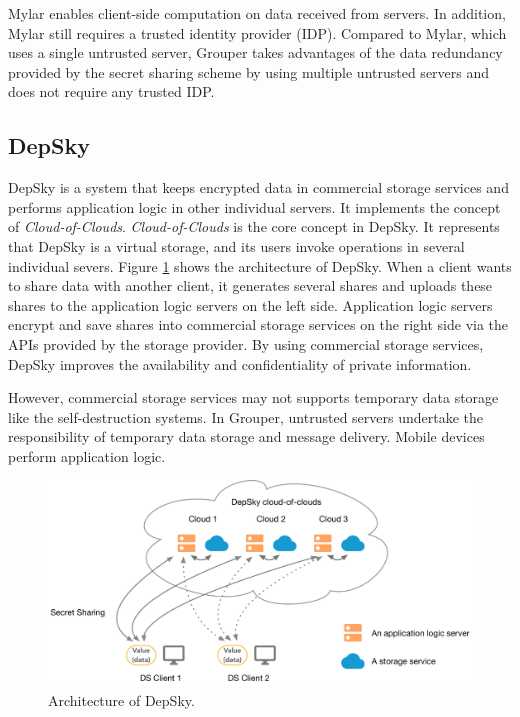 \documentclass[a4paper,11pt]{report}
\begin{document}
Mylar enables client-side computation on data received from servers.
In addition, Mylar still requires a trusted identity provider (IDP).
Compared to Mylar, which uses a single untrusted server, Grouper takes advantages of the data redundancy provided by the secret sharing scheme by using multiple untrusted servers and does not require any trusted IDP.

\subsection{DepSky}

DepSky\cite{bessani2013depsky} is a system that keeps encrypted data in commercial storage services and performs application logic in other individual servers.
It implements the concept of \emph{Cloud-of-Clouds}.  
\emph{Cloud-of-Clouds} is the core concept in DepSky.
It represents that DepSky is a virtual storage, and its users invoke operations in several individual severs. 
Figure \ref{fig:depsky} shows the architecture of DepSky.
When a client wants to share data with another client, it generates several shares and uploads these shares to the application logic servers on the left side.
Application logic servers encrypt and save shares into commercial storage services on the right side via the APIs provided by the storage provider.
By using commercial storage services, DepSky improves the availability and confidentiality of private information.

However, commercial storage services may not supports temporary data storage like the self-destruction systems.
In Grouper, untrusted servers undertake the responsibility of temporary data storage and message delivery.
Mobile devices perform application logic.

\begin{figure}
	\centering
	\includegraphics[scale=0.5]{depsky}
	\caption{Architecture of DepSky.}
	\label{fig:depsky}
\end{figure}
\end{document}
